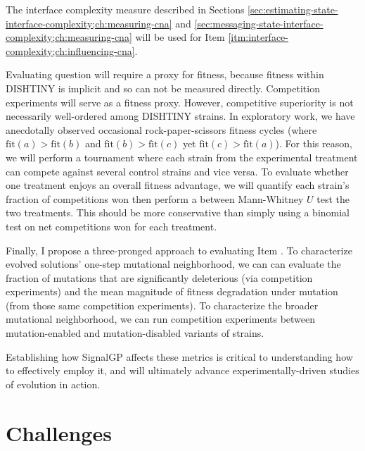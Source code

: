 The interface complexity measure described in Sections \ref{sec:estimating-state-interface-complexity;ch:measuring-cna} and \ref{sec:messaging-state-interface-complexity;ch:measuring-cna} will be used for Item \ref{itm:interface-complexity;ch:influencing-cna}.

Evaluating question \label{itm:fitness;ch:influencing-cna} will require a proxy for fitness, because fitness within DISHTINY is implicit and so can not be measured directly.
Competition experiments will serve as a fitness proxy.
However, competitive superiority is not necessarily well-ordered among DISHTINY strains.
In exploratory work, we have anecdotally observed occasional rock-paper-scissors fitness cycles (where $\mathrm{fit}(a) > \mathrm{fit}(b)$ and $\mathrm{fit}(b) > \mathrm{fit}(c)$ yet $\mathrm{fit}(c) > \mathrm{fit}(a)$).
For this reason, we will perform a tournament where each strain from the experimental treatment can compete against several control strains and vice versa.
To evaluate whether one treatment enjoys an overall fitness advantage, we will quantify each strain's fraction of competitions won then perform a between Mann-Whitney $U$ test the two treatments.
This should be more conservative than simply using a binomial test on net competitions won for each treatment.

Finally, I propose a three-pronged approach to evaluating Item \label{itm:robustness;ch:influencing-cna}.
To characterize evolved solutions' one-step mutational neighborhood, we can can evaluate the fraction of mutations that are significantly deleterious (via competition experiments) and the mean magnitude of fitness degradation under mutation (from those same competition experiments).
To characterize the broader mutational neighborhood, we can run competition experiments between mutation-enabled and mutation-disabled variants of strains.

Establishing how SignalGP affects these metrics is critical to understanding how to effectively employ it, and will ultimately advance experimentally-driven studies of evolution in action.

\section{Challenges}






